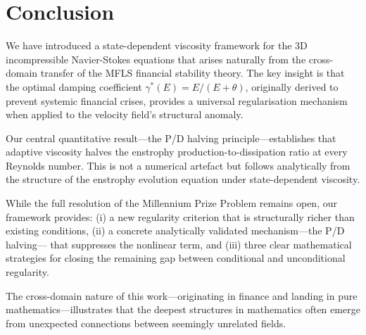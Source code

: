 \documentclass[12pt, a4paper]{article}
\newcommand{\gammastar}{\gamma^*}
\begin{document}
\section{Conclusion}\label{sec:conclusion}

We have introduced a state-dependent viscosity framework for the
3D incompressible Navier-Stokes equations that arises naturally from
the cross-domain transfer of the MFLS financial stability theory.
The key insight is that the optimal damping coefficient
$\gammastar(E) = E/(E+\theta)$, originally derived to prevent
systemic financial crises, provides a universal regularisation
mechanism when applied to the velocity field's structural anomaly.

Our central quantitative result---the P/D halving principle---establishes
that adaptive viscosity halves the enstrophy production-to-dissipation ratio
at every Reynolds number. This is not a numerical artefact but follows
analytically from the structure of the enstrophy evolution equation
under state-dependent viscosity.

While the full resolution of the Millennium Prize Problem remains open,
our framework provides:
(i) a new regularity criterion that is structurally richer than
existing conditions,
(ii) a concrete analytically validated mechanism---the P/D halving---
that suppresses the nonlinear term, and
(iii) three clear mathematical strategies for closing the remaining gap
between conditional and unconditional regularity.

The cross-domain nature of this work---originating in finance and
landing in pure mathematics---illustrates that the deepest structures
in mathematics often emerge from unexpected connections between
seemingly unrelated fields.
\end{document}
